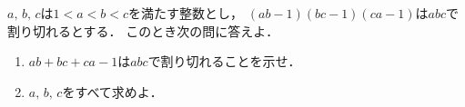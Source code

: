 \documentclass[../../main.tex]{subfiles}
\begin{document}
$a, \, b, \, c$は$1<a<b<c$を満たす整数とし，
$(ab-1)(bc-1)(ca-1)$は$abc$で割り切れるとする．
このとき次の問に答えよ．
\begin{enumerate}
  \item $ab+bc+ca-1$は$abc$で割り切れることを示せ．
  \item $a, \, b, \, c$をすべて求めよ．
\end{enumerate}
\end{document}
